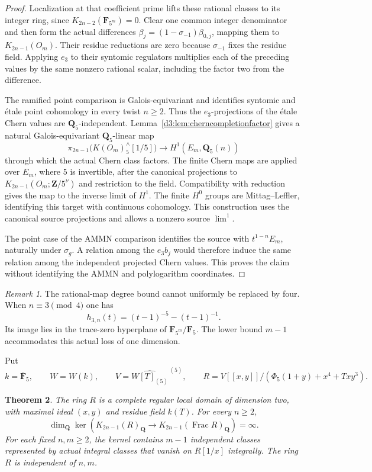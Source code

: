 \documentclass[11pt,a4paper]{amsart}
\numberwithin{equation}{section}
\newtheorem{theorem}{Theorem}[section]
\theoremstyle{definition}
\theoremstyle{remark}
\newtheorem{remark}[theorem]{Remark}
\begin{document}
\begin{proof}
Localization at that coefficient prime lifts these rational
classes to its integer ring, since
$K_{2n-2}(\mathbf F_{5^m})=0$.
Clear one common integer denominator and then form the actual
differences
$\beta_j=(1-\sigma_{-1})\beta_{0,j}$, mapping them to $K_{2n-1}(O_m)$.
Their residue reductions are zero because $\sigma_{-1}$ fixes
the residue field.  Applying $e_3$ to their syntomic regulators
multiplies each of the preceding values by the same nonzero
rational scalar, including the factor two from the difference.

The ramified point comparison
\cite[Example~2.2.4 and Propositions~2.2.7, 2.2.9, 2.3.4]{HuberKings}
is Galois-equivariant and identifies syntomic and \'etale point
cohomology in every twist $n\geq2$.  Thus the $e_3$-projections
of the \'etale Chern values are $\mathbf Q_5$-independent.
Lemma~\ref{d3:lem:cherncompletionfactor} gives a natural
Galois-equivariant $\mathbf Q_5$-linear map
\[
 \pi_{2n-1}\bigl(K(O_m)^\wedge_5[1/5]\bigr)
       \longrightarrow H^1(E_m,\mathbf Q_5(n))
\]
through which the actual Chern class factors. The finite Chern
maps are applied over $E_m$, where $5$ is invertible, after the
canonical projections to $K_{2n-1}(O_m;\mathbf Z/5^\nu)$ and
restriction to the field. Compatibility with reduction gives the
map to the inverse limit of $H^1$. The finite $H^0$ groups are
Mittag--Leffler, identifying this target with continuous cohomology.
This construction uses the canonical source projections and
allows a nonzero source $\lim^1$.

The point case of the AMMN comparison identifies the source with
$t^{1-n}E_m$, naturally under $\sigma_g$.  A relation among the
$e_3b_j$ would therefore induce the same relation among the
independent projected Chern values.  This proves the claim
without identifying the AMMN and polylogarithm coordinates.
\end{proof}

\begin{remark}
The rational-map degree bound cannot uniformly be replaced by four.
When $n\equiv3\pmod4$ one has
\[
 h_{3,n}(t)=(t-1)^{-5}-(t-1)^{-1}.
\]
Its image lies in the trace-zero hyperplane of
$\mathbf F_{5^m}/\mathbf F_5$.  The lower bound $m-1$ accommodates
this actual loss of one dimension.
\end{remark}

Put
\[
 k=\overline{\mathbf F}_5,\qquad W=W(k),\qquad
 V=\widehat{W[T]_{(5)}}^{\,(5)},\qquad
 R=V[[x,y]]/(\Phi_5(1+y)+x^4+Txy^3).
\]

\begin{theorem}
\label{d2ext:dimtwoCompleteAllOddInfiniteRank}
The ring $R$ is a complete regular local domain of dimension two,
with maximal ideal $(x,y)$ and residue field $k(T)$.
For every $n\geq2$,
\[
 \dim_{\mathbf Q}\ker\left(
 K_{2n-1}(R)_{\mathbf Q}\longrightarrow
 K_{2n-1}(\operatorname{Frac}R)_{\mathbf Q}\right)=\infty.
\]
For each fixed $n,m\geq2$, the kernel contains $m-1$ independent
classes represented by actual integral classes that vanish on
$R[1/x]$ integrally.  The ring $R$ is independent of $n,m$.
\end{theorem}
\end{document}
